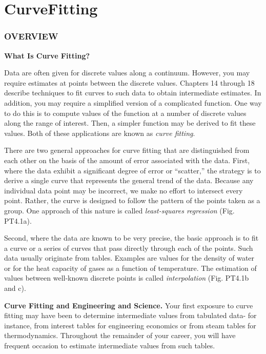 \documentclass[../main.tex]{subfiles}
\begin{document}
\part{CurveFitting}

\section{OVERVIEW}

\noindent \textbf{What Is Curve Fitting?}

\noindent Data are often given for discrete values along a continuum. However, you may require estimates at points between the discrete values. Chapters 14 through 18 describe techniques to
fit curves to such data to obtain intermediate estimates. In addition, you may require a simplified version of a complicated function. One way to do this is to compute values of the
function at a number of discrete values along the range of interest. Then, a simpler function
may be derived to fit these values. Both of these applications are known as \textit{curve fitting}.

There are two general approaches for curve fitting that are distinguished from each
other on the basis of the amount of error associated with the data. First, where the data
exhibit a significant degree of error or ``scatter,'' the strategy is to derive a single curve that
represents the general trend of the data. Because any individual data point may be incorrect, we make no effort to intersect every point. Rather, the curve is designed to follow the
pattern of the points taken as a group. One approach of this nature is called \textit{least-squares
regression} (Fig. PT4.1a).

Second, where the data are known to be very precise, the basic approach is to fit a
curve or a series of curves that pass directly through each of the points. Such
data usually originate from tables. Examples are values for the density of water
or for the heat capacity of gases as a
function of temperature. The estimation
of values between well-known discrete
points is called \textit{interpolation} (Fig.
PT4.1b and c).

\noindent \textbf{Curve Fitting and Engineering and
Science. }  Your first exposure to curve
fitting may have been to determine intermediate values from tabulated data- for instance, from interest tables for
engineering economics or from steam tables for thermodynamics. Throughout the remainder of your career, you will have frequent occasion to estimate intermediate values from such tables.
\end{document}
